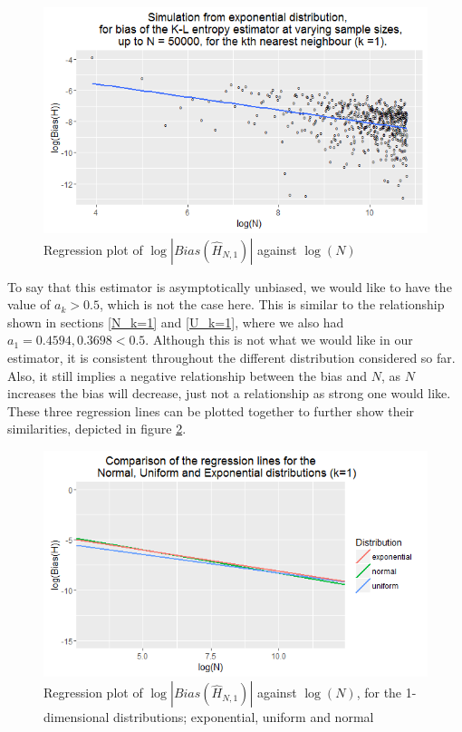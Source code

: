 \documentclass{report}
\begin{document}
\begin{figure}
  \begin{center}
    \includegraphics[width=\textwidth]{./Graphs/Expo_k=1_plot.png}
  \end{center}
\caption{Regression plot of $\log|Bias(\hat{H}_{N, 1})|$ against $\log(N)$}
  \label{expo_k=1_graph}
\end{figure}

To say that this estimator is asymptotically unbiased, we would like to have the value of $a_{k} > 0.5$, which is not the case here. This is similar to the relationship shown in sections \ref{N_k=1} and \ref{U_k=1}, where we also had $a_{1} = 0.4594, 0.3698 < 0.5$. Although this is not what we would like in our estimator, it is consistent throughout the different distribution considered so far. Also, it still implies a negative relationship between the bias and $N$, as $N$ increases the bias will decrease, just not a relationship as strong one would like. These three regression lines can be plotted together to further show their similarities, depicted in figure \ref{E_U_N_k=1_graph}.

\begin{figure}
  \begin{center}
    \includegraphics[width=\textwidth]{./Graphs/EUN_k=1_plot.png}
  \end{center}
\caption{Regression plot of $\log|Bias(\hat{H}_{N, 1})|$ against $\log(N)$, for the 1-dimensional distributions; exponential, uniform and normal}
  \label{E_U_N_k=1_graph}
\end{figure}
\end{document}
